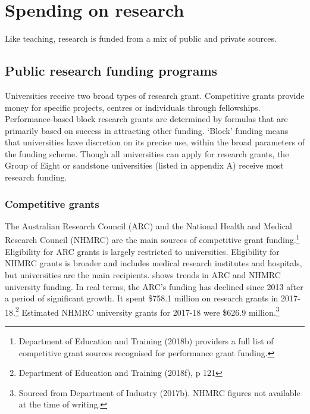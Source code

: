 \documentclass{grattan}
\begin{document}
%
\section{Spending on research}\label{sec:spending-on-research}

Like teaching, research is funded from a mix of public and private sources.

%
\subsection{Public research funding programs}\label{subsec:public-research-funding-programs}

Universities receive two broad types of research grant. Competitive grants provide money for specific projects, centres or individuals through fellowships. Performance-based block research grants are determined by formulas that are primarily based on success in attracting other funding. `Block' funding means that universities have discretion on its precise use, within the broad parameters of the funding scheme. Though all universities can apply for research grants, the Group of Eight or sandstone universities (listed in appendix A) receive most research funding.

%
\subsubsection{Competitive grants}\label{subsubsec:competitive-grants}

The Australian Research Council (ARC) and the National Health and Medical Research Council (NHMRC) are the main sources of competitive grant funding.\footnote{Department of Education and Training (2018b) providers a full list of competitive grant sources recognised for performance grant funding.} Eligibility for ARC grants is largely restricted to universities. Eligibility for NHMRC grants is broader and includes medical research institutes and hospitals, but universities are the main recipients.  shows trends in ARC and NHMRC university funding. In real terms, the ARC's funding has declined since 2013 after a period of significant growth. It spent \$758.1 million on research grants in 2017-18.\footnote{Department of Education and Training (2018f), p 121} Estimated NHMRC university grants for 2017-18 were \$626.9 million.\footnote{Sourced from Department of Industry (2017b). NHMRC figures not available at the time of writing.}
\end{document}
